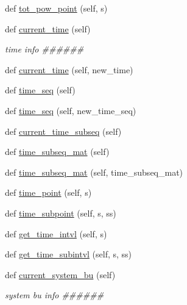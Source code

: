 \begin{DoxyCompactItemize}
\item 
def \hyperlink{classonix_1_1sequence_1_1Sequence_a9adfb234a40f3b3b09cf3bab0389f31b}{tot\+\_\+pow\+\_\+point} (self, s)
\item 
def \hyperlink{classonix_1_1sequence_1_1Sequence_a09111cb428953c0504a7be4f796c1091}{current\+\_\+time} (self)
\begin{DoxyCompactList}\small\item\em time info \#\#\#\#\#\# \end{DoxyCompactList}\item 
def \hyperlink{classonix_1_1sequence_1_1Sequence_a860aaaea529e3888b2a08f3b1543aa6f}{current\+\_\+time} (self, new\+\_\+time)
\item 
def \hyperlink{classonix_1_1sequence_1_1Sequence_ab7a35d62cc3f5afd8a71a429d46c2732}{time\+\_\+seq} (self)
\item 
def \hyperlink{classonix_1_1sequence_1_1Sequence_a7e33e7f75467dc9361a0f57003000faa}{time\+\_\+seq} (self, new\+\_\+time\+\_\+seq)
\item 
def \hyperlink{classonix_1_1sequence_1_1Sequence_a12a657e78bd3b21ab49b47ef81ef83a7}{current\+\_\+time\+\_\+subseq} (self)
\item 
def \hyperlink{classonix_1_1sequence_1_1Sequence_ae9b0583c1a97a3587f6a3e1e0b04651e}{time\+\_\+subseq\+\_\+mat} (self)
\item 
def \hyperlink{classonix_1_1sequence_1_1Sequence_a9e1f8750228a3af64160d1e79de4d2bc}{time\+\_\+subseq\+\_\+mat} (self, time\+\_\+subseq\+\_\+mat)
\item 
def \hyperlink{classonix_1_1sequence_1_1Sequence_af34c5779028d0a5a354849868ad4f0a6}{time\+\_\+point} (self, s)
\item 
def \hyperlink{classonix_1_1sequence_1_1Sequence_a8fc0911f2e6309f2028885f585a9d36a}{time\+\_\+subpoint} (self, s, ss)
\item 
def \hyperlink{classonix_1_1sequence_1_1Sequence_a418b4785a15e01ba6ac87465882ad75a}{get\+\_\+time\+\_\+intvl} (self, s)
\item 
def \hyperlink{classonix_1_1sequence_1_1Sequence_a389b1c44ba38aba5e575c098ff0220c8}{get\+\_\+time\+\_\+subintvl} (self, s, ss)
\item 
def \hyperlink{classonix_1_1sequence_1_1Sequence_a6c98046f77413da7f3f0d77b5341aaf4}{current\+\_\+system\+\_\+bu} (self)
\begin{DoxyCompactList}\small\item\em system bu info \#\#\#\#\#\# \end{DoxyCompactList}\item 

\end{DoxyCompactItemize}
